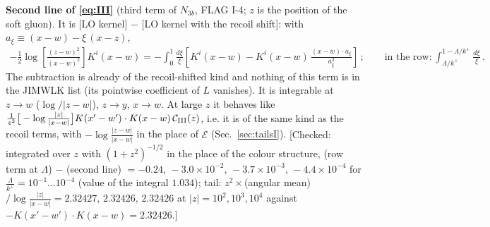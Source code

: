 \documentclass[9pt]{article}
\numberwithin{equation}{section}
\begin{document}
\noindent\textbf{Second line of \eqref{eq:III}} (third term of $N_{3b}$, FLAG I-4; $z$ is the position of the soft gluon). It is [LO kernel] $-$ [LO kernel with the recoil shift]: with $a_{\xi}\equiv(x-w)-\xi\,(x-z)$,
\begin{align}
-\frac12\log\left[\frac{(z-w)^{2}}{(x-w)^{2}}\right]K^{i}(x-w)=-\int_{0}^{1}\frac{d\xi}{\xi}\left[K^{i}(x-w)-K^{i}(x-w)\,\frac{(x-w)\cdot a_{\xi}}{a_{\xi}^{2}}\right]\,;\qquad\text{in the row:}\ \int_{\Lambda/k^{+}}^{1-\Lambda/k^{+}}\frac{d\xi}{\xi}\,.\label{eq:IIIB}
\end{align}
The subtraction is already of the recoil-shifted kind and nothing of this term is in the JIMWLK list (its pointwise coefficient of $L$ vanishes). It is integrable at $z\to w$ ($\log/|z-w|$), $z\to y$, $x\to w$. At large $z$ it behaves like $\frac{1}{z^{2}}\big[-\log\frac{|z|}{|x-w|}\big]K(x'-w')\cdot K(x-w)\,\mathcal{C}_{\rm III}(z)$, i.e. it is of the same kind as the recoil terms, with $-\log\frac{|z-w|}{|x-w|}$ in the place of $\mathcal{E}$ (Sec.~\ref{sec:tailsI}). {\color{gray}\small [Checked: integrated over $z$ with $(1+z^{2})^{-1/2}$ in the place of the colour structure, (row term at $\Lambda$) $-$ (second line) $=-0.24,\,-3.0\times10^{-2},\,-3.7\times10^{-3},\,-4.4\times10^{-4}$ for $\frac{\Lambda}{k^{+}}=10^{-1}\dots10^{-4}$ (value of the integral $1.034$); tail: $z^{2}\times$(angular mean)$/\log\frac{|z|}{|x-w|}=2.32427,\,2.32426,\,2.32426$ at $|z|=10^{2},10^{3},10^{4}$ against $-K(x'-w')\cdot K(x-w)=2.32426$.]}
\end{document}
